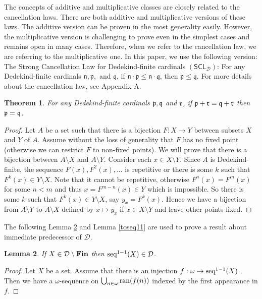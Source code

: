\documentclass{amsart}
\newcommand{\SCL}{\ensuremath{\mathsf{SCL}}}
\newcommand{\Fin}{\textbf{\textup{Fin}}}
\newcommand{\seq}{\textup{seq}}
\newcommand{\ran}{\textup{ran}}
\renewcommand{\leq}{\leqslant}
\newcommand{\1}{\ensuremath{\mathds{1}}}
\theoremstyle{plain}
\newtheorem{thm}{Theorem}[section]
\newtheorem{lem}[thm]{Lemma}
\theoremstyle{boldrk}
\theoremstyle{definition}
\begin{document}
The concepts of additive and multiplicative classes are closely related to the cancellation laws. There are both additive and multiplicative versions of these laws. The additive version can be proven in the most generality easily. However, the multiplicative version is challenging to prove even in the simplest cases and remains open in many cases. Therefore, when we refer to the cancellation law, we are referring to the multiplicative one. In this paper, we use the following version: The Strong Cancellation Law for Dedekind-finite cardinals $(\SCL_{\mathcal{D}})$: For any Dedekind-finite cardinals $\mathfrak{n}, \mathfrak{p},$ and $\mathfrak{q}$, if $\mathfrak{n} \cdot \mathfrak{p} \leq \mathfrak{n} \cdot \mathfrak{q}$, then $\mathfrak{p} \leq \mathfrak{q}$. For more details about the cancellation law, see Appendix A.

\begin{thm}\label{canplus}
  For any Dedekind-finite cardinals $\frak{p},\frak{q}$ and $\frak{r}$, if $\frak{p}+\frak{r}=\frak{q}+\frak{r}$ then $\frak{p}=\frak{q}$.  
\end{thm}

\begin{proof}
Let $A$ be a set such that there is a bijection $F:X\to Y$ between subsets $X$ and $Y$ of $A$. Assume without the loss of generality that $F$ has no fixed point (otherwise we can restrict $F$ to non-fixed points). We will prove that there is a bijection between $A\setminus X$ and $A\setminus Y$. Consider each $x\in X\setminus Y$. Since $A$ is Dedekind-finite, the sequence $F(x),F^{2}(x),...$ is repetitive or there is some $k$ such that $F^{k}(x)\in Y\setminus X$. Note that it cannot be repetitive, otherwise $F^{n}(x)=F^{m}(x)$ for some $n<m$ and thus $x=F^{m-n}(x)\in Y$ which is impossible. So there is some $k$ such that $F^{k}(x)\in Y\setminus X$, say $y_{x}=F^{k}(x)$. Hence we have a bijection from $A\setminus Y$ to $A\setminus X$ defined by $x\mapsto y_{x}$ if $x\in X\setminus Y$ and leave other points fixed.   
\end{proof}

The following Lemma \ref{seq11} and Lemma \ref{toseq11} are used to prove a result about immediate predecessor of $\mathcal{D}$.


\begin{lem}\label{seq11}
If $X\in\mathcal{D}\setminus\Fin$ then $\seq^{1-1}(X)\in\mathcal{D}$.  
\end{lem}

\begin{proof}
 Let $X$ be a set. Assume that there is an injection $f:\omega\to \seq^{1-1}(X)$. Then we have a $\omega$-sequence on $\bigcup_{n\in\omega}\ran(f(n))$ indexed by the first appearance in $f$. 
\end{proof}
\end{document}
